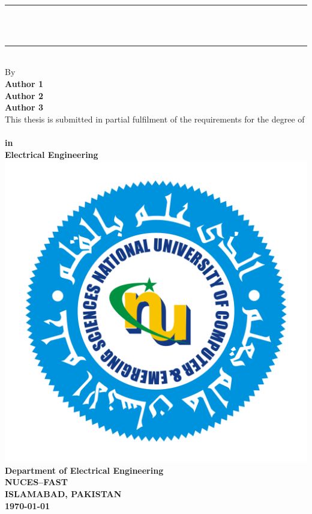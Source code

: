 \documentclass[12pt, a4paper, oneside]{Thesis} %
\begin{document}
\begin{titlepage}
\begin{center}

\textsc{\LARGE \univname}\\[0.5cm] %
\rule{\linewidth}{0.5mm}\\[0.3cm]
{\Large \bfseries \ttitle}\\
\rule{\linewidth}{0.5mm}\\[0.5cm]

{\large By}\\[0.5cm]
{\large \bfseries Author 1\\ Author 2\\ Author 3}\\[1cm]

{\large This thesis is submitted in partial fulfilment of the requirements for the degree of}\\[1cm]
{\large \bfseries \degreename\\[0.2cm] in\\[0.2cm] Electrical Engineering}\\[1.0cm]

\includegraphics[scale=0.15]{Figures/NU_Logo.png}\\[1.0cm]

{\large \bfseries Department of Electrical Engineering}\\[0.2cm]
{\large \bfseries NUCES--FAST}\\[0.2cm]
{\large \bfseries ISLAMABAD, PAKISTAN}\\[0.2cm]
{\large \bfseries \today}

\end{center}
\end{titlepage}
\end{document}
